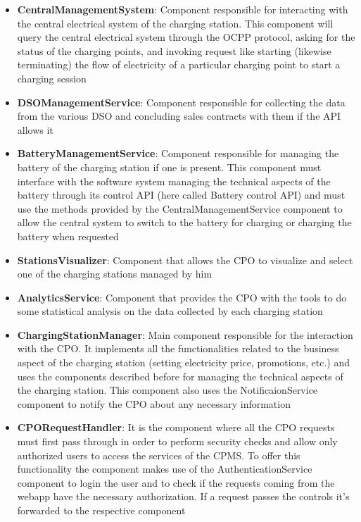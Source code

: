 \begin{itemize}
    \item \textbf{CentralManagementSystem}: Component responsible for interacting with the central electrical system of the charging station. This component will query the central electrical system through the OCPP protocol, asking for the status of the charging points, and invoking request like starting (likewise terminating) the flow of electricity of a particular charging point to start a charging session

    \item \textbf{DSOManagementService}: Component responsible for collecting the data from the various DSO and concluding sales contracts with them if the API allows it

    \item \textbf{BatteryManagementService}: Component responsible for managing the battery of the charging station if one is present. This component must interface with the software system managing the technical aspects of the battery through its control API (here called Battery control API) and must use the methods provided by the CentralManagementService component to allow the central system to switch to the battery for charging or charging the battery when requested

    \item \textbf{StationsVisualizer}: Component that allows the CPO to visualize and select one of the charging stations managed by him

    \item \textbf{AnalyticsService}: Component that provides the CPO with the tools to do some statistical analysis on the data collected by each charging station

    \item \textbf{ChargingStationManager}: Main component responsible for the interaction with the CPO. It implements all the functionalities related to the business aspect of the charging station (setting electricity price, promotions, etc.) and uses the components described before for managing the technical aspects of the charging station. This component also uses the NotificaionService component to notify the CPO about any necessary information

    \item \textbf{CPORequestHandler}: It is the component where all the CPO requests must first pass through in order to perform security checks and allow only authorized users to access the services of the CPMS. To offer this functionality the component makes use of the AuthenticationService component to login the user and to check if the requests coming from the webapp have the necessary authorization. If a request passes the controls it's forwarded to the respective component


\end{itemize}
